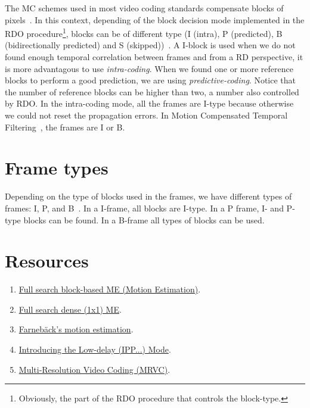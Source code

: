 The MC schemes used in most video coding standards compensate blocks
of pixels~\cite{vruiz__ME}. In this context, depending of the block
decision mode implemented in the RDO procedure\footnote{Obviously, the
  part of the RDO procedure that controls the block-type.}, blocks can
be of different type (I (intra), P (predicted), B (bidirectionally
predicted) and S (skipped))~\cite{vruiz__MC}. A I-block is used when
we do not found enough temporal correlation between frames and from a
RD perspective, it is more advantagous to use
\emph{intra-coding}. When we found one or more reference blocks to
perform a good prediction, we are using
\emph{predictive-coding}. Notice that the number of reference blocks
can be higher than two, a number also controlled by RDO. In the
intra-coding mode, all the frames are I-type because otherwise we
could not reset the propagation errors. In Motion Compensated Temporal
Filtering~\cite{vruiz__MCTF}, the frames are I or B.

\section{Frame types}

Depending on the type of blocks used in the frames, we have different
types of frames: I, P, and B~\cite{vruiz__MC}. In a I-frame, all
blocks are I-type. In a P frame, I- and P-type blocks can be found. In
a B-frame all types of blocks can be used.

\section{Resources}
\begin{enumerate}
\item \href{https://github.com/vicente-gonzalez-ruiz/motion_estimation/blob/main/src/motion_estimation/full_search_block_ME.ipynb}{Full search block-based ME (Motion Estimation)}.
\item \href{https://github.com/vicente-gonzalez-ruiz/motion_estimation/blob/main/src/motion_estimation/full_search_dense_ME.ipynb}{Full search dense (1x1) ME}.
\item \href{https://github.com/vicente-gonzalez-ruiz/motion_estimation/blob/main/src/motion_estimation/farneback_ME.ipynb}{Farnebäck's motion estimation}.
\item \href{https://github.com/vicente-gonzalez-ruiz/motion_compensation/blob/master/introducing_IPPP.ipynb}{Introducing the Low-delay (IPP...) Mode}.
\item \href{https://github.com/Sistemas-Multimedia/MRVC}{Multi-Resolution Video Coding (MRVC)}.
\end{enumerate}

